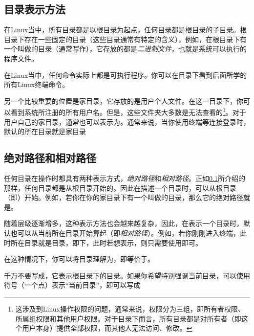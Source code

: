 \subsection{目录表示方法}\label{subsec:认识Linux目录-目录表示方法}

在Linux当中，所有目录都是以根目录\code{/}为起点，任何目录都是根目录的子目录。根目录下存在一些固定的目录（这些目录通常有特定的含义），例如，在根目录下有一个叫做的目录（通常写作），它存放的都是\emph{二进制文件}，也就是系统可以执行的程序文件。

\begin{attention}
    在Linux当中，任何命令实际上都是可执行程序。你可以在目录下看到后面所学的所有Linux终端命令。
\end{attention}

另一个比较重要的位置是家目录，它存放的是用户个人文件。在这一目录下，你可以看到系统所注册的所有用户名。但是，这些文件夹大多数是无法查看的\footnote{这涉及到Linux操作权限的问题，通常来说，权限分为三组，即所有者权限、所属组权限和其他用户权限。对于目录下而言，所有目录都是对所有者（即这个用户本身）提供全部权限，而其他人无法访问、修改。}。对于用户自己的家目录，通常也可以表示为\code{\~}。通常来说，当你使用终端等连接登录时，默认的所在目录就是家目录\code{\~}

\subsection{绝对路径和相对路径}\label{subsec:认识Linux目录-绝对路径和相对路径}

任何目录在操作时都具有两种表示方式，\emph{绝对路径}和\emph{相对路径}。正如\ref{subsec:认识Linux目录-目录表示方法}所介绍的那样，任何目录都是从根目录开始的。因此在描述一个目录时，可以从根目录（即\code{/}）开始。例如，若你在你的家目录下有一个叫做的目录，那么它的绝对路径就是。

随着层级逐渐增多，这种表示方法也会越来越复杂，因此，在表示一个目录时，默认也可以从当前所在目录开始算起（即\emph{相对路径}）。例如，若你刚刚进入终端，此时所在目录就是\code{\~}目录，即下，此时若想表示，则只需要使用即可。

\begin{attention}
    在这种情况下，你可以将目录理解为，即等价于。

    千万不要写成，它表示根目录下的目录。如果你希望特别强调当前目录，可以使用符号（一个点）表示“当前目录”，即可以写成
\end{attention}

